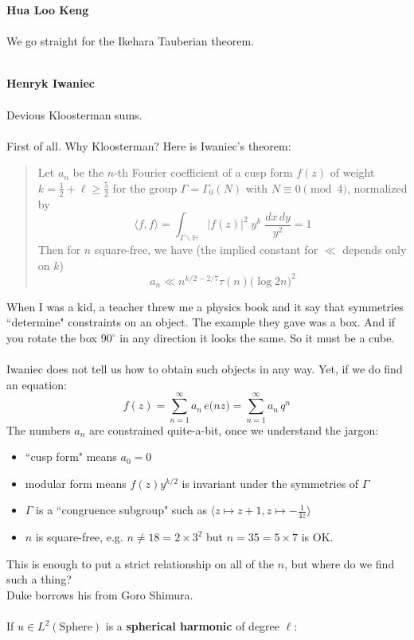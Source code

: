 \documentclass[12pt]{article}
\begin{document}
\newpage 

\noindent \textbf{Hua Loo Keng} \\ \\
We go straight for the Ikehara Tauberian theorem. \\ \\

\newpage 

\noindent \textbf{Henryk Iwaniec} \\ \\
Devious Kloosterman sums. \\ \\
First of all.  Why Kloosterman?  Here is Iwaniec's theorem: 
\begin{quotation} 
Let $a_n$ be the $n$-th Fourier coefficient of a cusp form $f(z)$ of weight $k = \frac{1}{2} + \ell \geq \frac{5}{2}$ for the group $\Gamma = \Gamma_0(N)$ with $N \equiv 0 \pmod 4$, normalized by 
$$ \langle f, f \rangle = \int_{\Gamma \backslash \mathbb{H}} \big| f(z) \big|^2 \; y^k \; \frac{dx \, dy}{y^2 } = 1$$ 
Then for $n$ square-free, we have (the implied constant for $\ll$ depends only on $k$)
$$  a_n \ll n^{k/2 - 2/7} \tau (n) \big( \log 2n \big)^2 $$
\end{quotation}
When I was a kid, a teacher threw me a physics book and it say that symmetries ``determine" constraints on an object.  The example they gave was a box.  And if you rotate the box $90^\circ$ in any direction it looks the same.   So it must be a cube. \\ \\
Iwaniec does not tell us how to obtain such objects in any way.  Yet, if we do find an equation:
$$ f(z) = \sum_{n=1}^\infty a_n \, e \big( n z \big) 
= \sum_{n=1}^\infty a_n \, q^n $$
The numbers $a_n$ are constrained quite-a-bit, once we understand the jargon:
\begin{itemize}
\item ``cusp form" means $a_0 = 0$
\item modular form means $f(z) y^{k/2}$ is invariant under the symmetries of $\Gamma$
\item $\Gamma$ is a ``congruence subgroup" such as $\big\langle z \mapsto z + 1, z \mapsto - \frac{1}{4z} \big\rangle$
\item $n$ is square-free, e.g. $n \neq 18 = 2 \times 3^2 $ but $n = 35 = 5 \times 7$ is OK.
\end{itemize}
This is enough to put a strict relationship on all of the $n$, but where do we find such a thing? \\ Duke borrows his from Goro Shimura. \\ \\ If $u \in L^2 (\text{Sphere})$ is a \textbf{spherical harmonic} of degree $\ell$:
\end{document}
